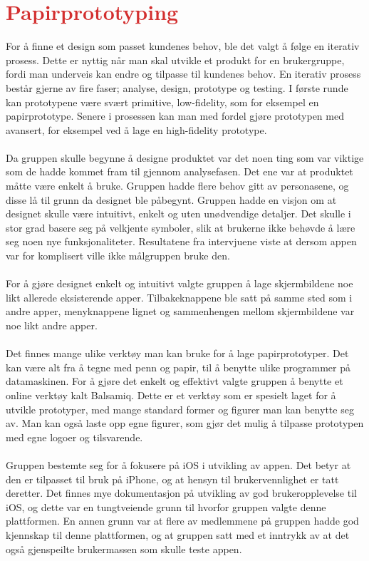 \section{\textcolor[HTML]{D32F2F}{Papirprototyping}}
For å finne et design som passet kundenes behov, ble det valgt å følge en iterativ prosess. Dette er nyttig når man skal utvikle et produkt for en brukergruppe, fordi man underveis kan endre og tilpasse til kundenes behov. En iterativ prosess består gjerne av fire faser; analyse, design, prototype og testing. I første runde kan prototypene være svært primitive, low-fidelity, som for eksempel en papirprototype. Senere i prosessen kan man med fordel gjøre prototypen med avansert, for eksempel ved å lage en high-fidelity prototype.
\\\\
Da gruppen skulle begynne å designe produktet var det noen ting som var viktige som de hadde kommet fram til gjennom analysefasen. Det ene var at produktet måtte være enkelt å bruke. Gruppen hadde flere behov gitt av personasene, og disse lå til grunn da designet ble påbegynt. Gruppen hadde en visjon om at designet skulle være intuitivt, enkelt og uten unødvendige detaljer. Det skulle i stor grad basere seg på velkjente symboler, slik at brukerne ikke behøvde å lære seg noen nye funksjonaliteter. Resultatene fra intervjuene viste at dersom appen var for komplisert ville ikke målgruppen bruke den.
\\\\
For å gjøre designet enkelt og intuitivt valgte gruppen å lage skjermbildene noe likt allerede eksisterende apper. Tilbakeknappene ble satt på samme sted som i andre apper, menyknappene lignet og sammenhengen mellom skjermbildene var noe likt andre apper.
\\\\
Det finnes mange ulike verktøy man kan bruke for å lage papirprototyper. Det kan være alt fra å tegne med penn og papir, til å benytte ulike programmer på datamaskinen. For å gjøre det enkelt og effektivt valgte gruppen å benytte et online verktøy kalt Balsamiq. Dette er et verktøy som er spesielt laget for å utvikle prototyper, med mange standard former og figurer man kan benytte seg av. Man kan også laste opp egne figurer, som gjør det mulig å tilpasse prototypen med egne logoer og tilsvarende.
\\\\
Gruppen bestemte seg for å fokusere på iOS i utvikling av appen. Det betyr at den er tilpasset til bruk på iPhone, og at hensyn til brukervennlighet er tatt deretter. Det finnes mye dokumentasjon på utvikling av god brukeropplevelse til iOS, og dette var en tungtveiende grunn til hvorfor gruppen valgte denne plattformen. En annen grunn var at flere av medlemmene på gruppen hadde god kjennskap til denne plattformen, og at gruppen satt med et inntrykk av at det også gjenspeilte brukermassen som skulle teste appen.
